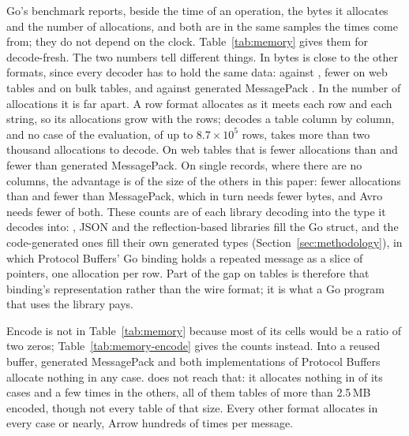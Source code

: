 Go's benchmark reports, beside the time of an operation, the bytes it
allocates and the number of allocations, and both are in the same samples
the times come from; they do not depend on the clock.
Table~\ref{tab:memory} gives them for decode-fresh. The two numbers tell
different things. In bytes \colbin{} is close to the other formats, since
every decoder has to hold the same data: against
,  fewer on
web tables and  on bulk tables, and
against generated MessagePack
{\let\textbf\relax{}}. In the
number of allocations it is far apart. A row format allocates as it meets
each row and each string, so its allocations grow with the rows; \colbin{}
decodes a table column by column, and no case of the evaluation, of up to
$8.7\times10^5$ rows, takes more than two thousand allocations to decode. On web
tables that is  fewer
allocations than  and
 fewer than generated
MessagePack. On single records, where there are no columns, the advantage
is of the size of the others in this paper:
 fewer allocations than
 and  fewer
than MessagePack, which in turn needs fewer bytes, and Avro needs fewer of
both. These counts are of each library decoding into the type it decodes
into: \colbin{}, JSON and the reflection-based libraries fill the Go struct,
and the code-generated ones fill their own generated types
(Section~\ref{sec:methodology}), in which Protocol Buffers' Go binding holds a
repeated message as a slice of pointers, one allocation per row. Part of
the gap on tables is therefore that binding's representation rather than
the wire format; it is what a Go program that uses the library pays.

\begin{table}[t]
\centering\footnotesize
{}
\caption{Allocations to encode a message into a reused buffer, by format:
the cases the format encodes, those in which it allocates nothing, and the
median and the largest number of allocations per encode over its cases.}
\label{tab:memory-encode}
\end{table}

Encode is not in Table~\ref{tab:memory} because most of its cells would be a
ratio of two zeros; Table~\ref{tab:memory-encode} gives the counts instead.
Into a reused buffer, generated MessagePack and both implementations of
Protocol Buffers allocate nothing in any case. \colbin{} does not reach
that: it allocates nothing in  of its
 cases and a few times in the others, all of
them tables of more than 2.5\,MB encoded, though not every table of that
size. Every other format allocates
in every case or nearly, Arrow hundreds of times per message.

